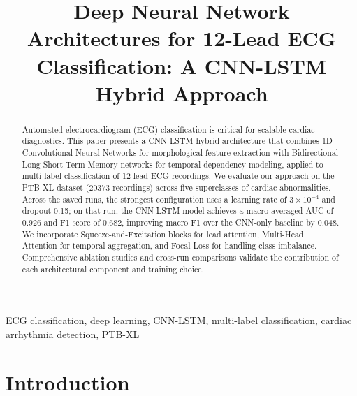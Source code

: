 \documentclass[conference]{IEEEtran}
\begin{document}
\title{Deep Neural Network Architectures for 12-Lead ECG Classification: A CNN-LSTM Hybrid Approach}

\author{
}

\maketitle

\begin{abstract}
Automated electrocardiogram (ECG) classification is critical for scalable cardiac diagnostics. This paper presents a CNN-LSTM hybrid architecture that combines 1D Convolutional Neural Networks for morphological feature extraction with Bidirectional Long Short-Term Memory networks for temporal dependency modeling, applied to multi-label classification of 12-lead ECG recordings. We evaluate our approach on the PTB-XL dataset (20373 recordings) across five superclasses of cardiac abnormalities. Across the saved runs, the strongest configuration uses a learning rate of $3\times10^{-4}$ and dropout 0.15; on that run, the CNN-LSTM model achieves a macro-averaged AUC of 0.926 and F1 score of 0.682, improving macro F1 over the CNN-only baseline by 0.048. We incorporate Squeeze-and-Excitation blocks for lead attention, Multi-Head Attention for temporal aggregation, and Focal Loss for handling class imbalance. Comprehensive ablation studies and cross-run comparisons validate the contribution of each architectural component and training choice.
\end{abstract}

\begin{IEEEkeywords}
ECG classification, deep learning, CNN-LSTM, multi-label classification, cardiac arrhythmia detection, PTB-XL
\end{IEEEkeywords}

\section{Introduction}
\end{document}
